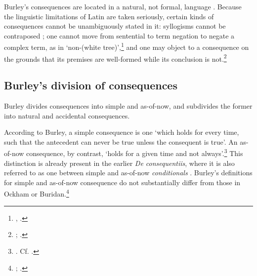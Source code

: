 \documentclass[]{birkjour}
\begin{document}
Burley's consequences are located in a natural, not formal, language \autocite[pp. 71-72]{HodgesBurley}. Because the linguistic limitations of Latin are taken seriously, certain kinds of consequences cannot be unambiguously stated in it: syllogisms cannot be contraposed \autocite[pp. 65.3-17; 207.31-208.9]{BurleyDPAL}; one cannot move from sentential to term negation to negate a complex term, as in `non-(white tree)',\footnote{\autocite[p. 131, par. 80]{Green-Pedersen1980b}, \autocite[pp. 214.14-21, 215.6-21]{BurleyDPAL}.} and one may object to a consequence on the grounds that its premises are well-formed while its conclusion is not.\footnote{\autocite[p. 150, par. 135]{Green-Pedersen1980b}; \autocite[pp. 211.31-33, 212.10-20]{BurleyDPAL}.}
	
\subsection{Burley's division of consequences}
Burley divides consequences into simple and as-of-now, and subdivides the former into natural and accidental consequences.

According to Burley, a simple consequence is one `which holds for every time, such that the antecedent can never be true unless the consequent is true'. An as-of-now consequence, by contrast, `holds for a given time and not always'.\footnote{\autocite[pp. 60.29-61.5]{BurleyDPAL}. Cf. \autocite[p. 199.19-25]{BurleyDPAL}.} This distinction is already present in the earlier \textit{De consequentiis}, where it is also referred to as one between simple and as-of-now \textit{conditionals} \autocite[p. 128, par. 69]{Green-Pedersen1980b}. Burley's definitions for simple and as-of-now consequence do not substantially differ from those in Ockham or Buridan.\footnote{\autocite[III-3. 1, pp. 587-588]{OckhamSL}; \autocite[I. 4, p. 23]{BuridanTC}.}
\end{document}
